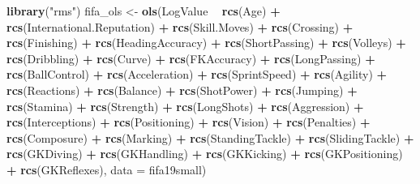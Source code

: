 \documentclass[]{krantz}
\newenvironment{Shaded}{\begin{snugshade}}{\end{snugshade}}
\newcommand{\DataTypeTok}[1]{\textcolor[rgb]{0.13,0.29,0.53}{#1}}
\newcommand{\KeywordTok}[1]{\textcolor[rgb]{0.13,0.29,0.53}{\textbf{#1}}}
\newcommand{\NormalTok}[1]{#1}
\newcommand{\OperatorTok}[1]{\textcolor[rgb]{0.81,0.36,0.00}{\textbf{#1}}}
\newcommand{\StringTok}[1]{\textcolor[rgb]{0.31,0.60,0.02}{#1}}
\begin{document}
\begin{Shaded}
\begin{Highlighting}[]
\KeywordTok{library}\NormalTok{(}\StringTok{"rms"}\NormalTok{)}
\NormalTok{fifa_ols <-}\StringTok{ }\KeywordTok{ols}\NormalTok{(LogValue }\OperatorTok{~}\StringTok{ }\KeywordTok{rcs}\NormalTok{(Age) }\OperatorTok{+}\StringTok{ }\KeywordTok{rcs}\NormalTok{(International.Reputation) }\OperatorTok{+}
\StringTok{        }\KeywordTok{rcs}\NormalTok{(Skill.Moves) }\OperatorTok{+}\StringTok{ }\KeywordTok{rcs}\NormalTok{(Crossing) }\OperatorTok{+}\StringTok{ }\KeywordTok{rcs}\NormalTok{(Finishing) }\OperatorTok{+}
\StringTok{        }\KeywordTok{rcs}\NormalTok{(HeadingAccuracy) }\OperatorTok{+}\StringTok{ }\KeywordTok{rcs}\NormalTok{(ShortPassing) }\OperatorTok{+}\StringTok{ }\KeywordTok{rcs}\NormalTok{(Volleys) }\OperatorTok{+}
\StringTok{        }\KeywordTok{rcs}\NormalTok{(Dribbling) }\OperatorTok{+}\StringTok{ }\KeywordTok{rcs}\NormalTok{(Curve) }\OperatorTok{+}\StringTok{ }\KeywordTok{rcs}\NormalTok{(FKAccuracy) }\OperatorTok{+}
\StringTok{        }\KeywordTok{rcs}\NormalTok{(LongPassing) }\OperatorTok{+}\StringTok{ }\KeywordTok{rcs}\NormalTok{(BallControl) }\OperatorTok{+}\StringTok{ }\KeywordTok{rcs}\NormalTok{(Acceleration) }\OperatorTok{+}
\StringTok{        }\KeywordTok{rcs}\NormalTok{(SprintSpeed) }\OperatorTok{+}\StringTok{ }\KeywordTok{rcs}\NormalTok{(Agility) }\OperatorTok{+}\StringTok{ }\KeywordTok{rcs}\NormalTok{(Reactions) }\OperatorTok{+}
\StringTok{        }\KeywordTok{rcs}\NormalTok{(Balance) }\OperatorTok{+}\StringTok{ }\KeywordTok{rcs}\NormalTok{(ShotPower) }\OperatorTok{+}\StringTok{ }\KeywordTok{rcs}\NormalTok{(Jumping) }\OperatorTok{+}\StringTok{ }\KeywordTok{rcs}\NormalTok{(Stamina) }\OperatorTok{+}
\StringTok{        }\KeywordTok{rcs}\NormalTok{(Strength) }\OperatorTok{+}\StringTok{ }\KeywordTok{rcs}\NormalTok{(LongShots) }\OperatorTok{+}\StringTok{ }\KeywordTok{rcs}\NormalTok{(Aggression) }\OperatorTok{+}
\StringTok{        }\KeywordTok{rcs}\NormalTok{(Interceptions) }\OperatorTok{+}\StringTok{ }\KeywordTok{rcs}\NormalTok{(Positioning) }\OperatorTok{+}\StringTok{ }\KeywordTok{rcs}\NormalTok{(Vision) }\OperatorTok{+}
\StringTok{        }\KeywordTok{rcs}\NormalTok{(Penalties) }\OperatorTok{+}\StringTok{ }\KeywordTok{rcs}\NormalTok{(Composure) }\OperatorTok{+}\StringTok{ }\KeywordTok{rcs}\NormalTok{(Marking) }\OperatorTok{+}
\StringTok{        }\KeywordTok{rcs}\NormalTok{(StandingTackle) }\OperatorTok{+}\StringTok{ }\KeywordTok{rcs}\NormalTok{(SlidingTackle) }\OperatorTok{+}\StringTok{ }\KeywordTok{rcs}\NormalTok{(GKDiving) }\OperatorTok{+}
\StringTok{        }\KeywordTok{rcs}\NormalTok{(GKHandling) }\OperatorTok{+}\StringTok{ }\KeywordTok{rcs}\NormalTok{(GKKicking) }\OperatorTok{+}\StringTok{ }\KeywordTok{rcs}\NormalTok{(GKPositioning) }\OperatorTok{+}
\StringTok{        }\KeywordTok{rcs}\NormalTok{(GKReflexes), }\DataTypeTok{data =}\NormalTok{ fifa19small)}
\end{Highlighting}
\end{Shaded}
\end{document}
